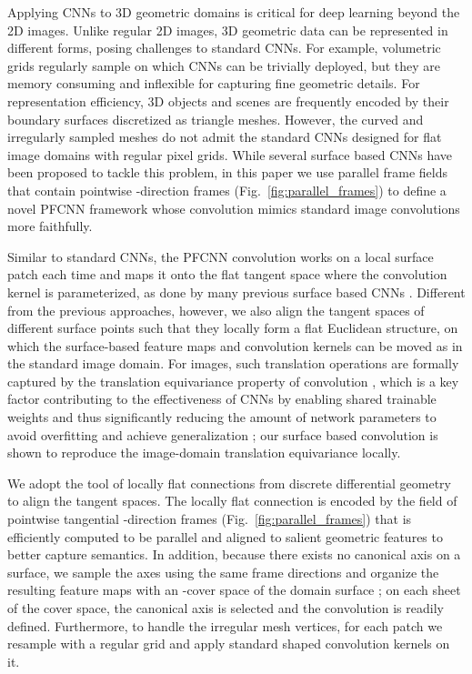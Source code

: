 \documentclass[10pt,twocolumn,letterpaper]{article}
\begin{document}
Applying CNNs to 3D geometric domains is critical for deep learning beyond the 2D images.
Unlike regular 2D images, 3D geometric data can be represented in different forms, posing challenges to standard CNNs.
For example, volumetric grids regularly sample  on which CNNs can be trivially deployed, but they are memory consuming and inflexible for capturing fine geometric details. 
For representation efficiency, 3D objects and scenes are frequently encoded by their boundary surfaces discretized as triangle meshes. 
However, the curved and irregularly sampled meshes do not admit the standard CNNs designed for flat image domains with regular pixel grids.
While several surface based CNNs have been proposed to tackle this problem, in this paper we use parallel frame fields that contain pointwise -direction frames (Fig.~\ref{fig:parallel_frames}) to define a novel PFCNN framework whose convolution mimics standard image convolutions more faithfully.

Similar to standard CNNs, the PFCNN convolution works on a local surface patch each time and maps it onto the flat tangent space where the convolution kernel is parameterized, as done by many previous surface based CNNs \cite{GeoCNN:ICCV2015,AnisoCNN:NIPS2016,MoNet2017,Poulenard:2018:Multidirectional}.
Different from the previous approaches, however, we also align the tangent spaces of different surface points such that they locally form a flat Euclidean structure, on which the surface-based feature maps and convolution kernels can be moved as in the standard image domain.
For images, such translation operations are formally captured by the translation equivariance property of convolution \cite{GeometricDL2017}, which is a key factor contributing to the effectiveness of CNNs by enabling shared trainable weights and thus significantly reducing the amount of network parameters to avoid overfitting and achieve generalization \cite{LeCun98,Goodfellow-et-al-2016};
our surface based convolution is shown to reproduce the image-domain translation equivariance locally.


We adopt the tool of locally flat connections from discrete differential geometry \cite{DirFieldEG2016} to align the tangent spaces.
The locally flat connection is encoded by the field of pointwise tangential -direction frames  (Fig.~\ref{fig:parallel_frames}) that is efficiently computed to be parallel and aligned to salient geometric features to better capture semantics.
In addition, because there exists no canonical axis on a surface, we sample the axes using the same  frame directions and organize the resulting feature maps with an -cover space of the domain surface \cite{dubrovin2012modern}; on each sheet of the cover space, the canonical axis is selected and the convolution is readily defined.
Furthermore, to handle the irregular mesh vertices, for each patch we resample with a regular grid and apply standard shaped convolution kernels on it.
\end{document}
